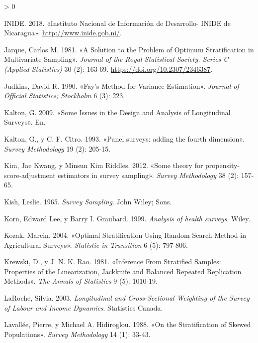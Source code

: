 \documentclass[
  12pt,
  spanish,
]{book}
\newlength{\cslhangindent}
\newenvironment{CSLReferences}[2] %
 {%
  \setlength{\parindent}{0pt}
  \ifodd #1 \everypar{\setlength{\hangindent}{\cslhangindent}}\ignorespaces\fi
  \ifnum #2 > 0
  \setlength{\parskip}{#2\baselineskip}
  \fi
 }%
 {}
\begin{document}
\begin{CSLReferences}{1}{0}
\leavevmode\hypertarget{ref-INIDE-NI}{}%
INIDE. 2018. {«Instituto Nacional de Información de Desarrollo- INIDE de Nicaragua»}. \url{http://www.inide.gob.ni/}.

\leavevmode\hypertarget{ref-Jarque_1981}{}%
Jarque, Carlos M. 1981. {«A Solution to the Problem of Optimum Stratification in Multivariate Sampling»}. \emph{Journal of the Royal Statistical Society. Series C (Applied Statistics)} 30 (2): 163-69. \url{https://doi.org/10.2307/2346387}.

\leavevmode\hypertarget{ref-Judkins_1990}{}%
Judkins, David R. 1990. {«Fay's Method for Variance Estimation»}. \emph{Journal of Official Statistics; Stockholm} 6 (3): 223.

\leavevmode\hypertarget{ref-Kalton_2009}{}%
Kalton, G. 2009. {«Some Issues in the Design and Analysis of Longitudinal Surveys»}. En.

\leavevmode\hypertarget{ref-Kalton_Citro_1993}{}%
Kalton, G., y C. F. Citro. 1993. {«Panel surveys: adding the fourth dimension»}. \emph{Survey Methodology} 19 (2): 205-15.

\leavevmode\hypertarget{ref-Kim_Riddles_2012}{}%
Kim, Jae Kwang, y Minsun Kim Riddles. 2012. {«Some theory for propensity-score-adjustment estimators in survey sampling»}. \emph{Survey Methodology} 38 (2): 157-65.

\leavevmode\hypertarget{ref-Kish_1965}{}%
Kish, Leslie. 1965. \emph{Survey Sampling}. John Wiley; Sons.

\leavevmode\hypertarget{ref-Korn_Graubard_1999}{}%
Korn, Edward Lee, y Barry I. Graubard. 1999. \emph{Analysis of health surveys}. Wiley.

\leavevmode\hypertarget{ref-Kozak_2004}{}%
Kozak, Marcin. 2004. {«Optimal Stratification Using Random Search Method in Agricultural Surveys»}. \emph{Statistic in Transition} 6 (5): 797-806.

\leavevmode\hypertarget{ref-Krewski_Rao_1981}{}%
Krewski, D., y J. N. K. Rao. 1981. {«Inference From Stratified Samples: Properties of the Linearization, Jackknife and Balanced Repeated Replication Methods»}. \emph{The Annals of Statistics} 9 (5): 1010-19.

\leavevmode\hypertarget{ref-LaRoche_2003}{}%
LaRoche, Silvia. 2003. \emph{Longitudinal and Cross-Sectional Weighting of the Survey of Labour and Income Dynamics}. Statistics Canada.

\leavevmode\hypertarget{ref-Lavallee_Hidiroglou_1988}{}%
Lavallée, Pierre, y Michael A. Hidiroglou. 1988. {«On the Stratification of Skewed Populations»}. \emph{Survey Methodology} 14 (1): 33-43.


\end{CSLReferences}
\end{document}
